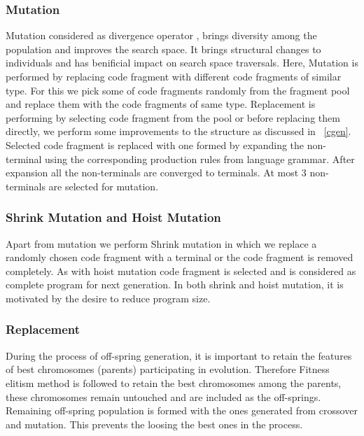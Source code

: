 \documentclass{acm_proc_article-sp}
\begin{document}
\subsubsection{Mutation}
Mutation considered as divergence operator \cite{Byrne10}, brings diversity among the population and improves the search space. It brings structural changes to individuals and has benificial impact on search space traversals. Here, Mutation is performed by replacing code fragment with different code fragments of similar type. For this we pick some of code fragments randomly from the fragment pool and replace them with the code fragments of same type. Replacement is performing by selecting code fragment from the pool or before replacing them directly, we perform some improvements to the structure as discussed in ~\autoref{cgen}. Selected code fragment is replaced with one formed by expanding the non-terminal using the corresponding production rules from language grammar. After expansion all the non-terminals are converged to terminals. At most 3 non-terminals are selected for mutation.

\subsubsection{Shrink Mutation and Hoist Mutation}
Apart from mutation we perform Shrink mutation in which we replace a randomly chosen code fragment with a terminal or the code fragment is removed completely. As with hoist mutation code fragment is selected and is considered as complete program for next generation. In both shrink and hoist mutation, it is motivated by the desire to reduce program size. 

\subsubsection{Replacement}
During the process of off-spring generation, it is important to retain the features of best chromosomes (parents) participating in evolution. Therefore Fitness elitism method is followed to retain the best chromosomes among the parents, these chromosomes remain untouched and are included as the off-springs. Remaining off-spring population is formed with the ones generated from crossover and mutation. This prevents the loosing the best ones in the process.
\end{document}
